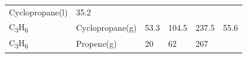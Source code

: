 \documentclass[
]{book}
\theoremstyle{definition}
\theoremstyle{definition}
\theoremstyle{definition}
\theoremstyle{remark}
\begin{document}
\begin{longtable}[]{@{}llllll@{}}
\begin{minipage}[t]{0.17\columnwidth}
Cyclopropane(l)\strut
\end{minipage} & \begin{minipage}[t]{0.15\columnwidth}\raggedright
35.2\strut
\end{minipage} & \begin{minipage}[t]{0.15\columnwidth}\raggedright
\strut
\end{minipage} & \begin{minipage}[t]{0.14\columnwidth}\raggedright
\strut
\end{minipage} & \begin{minipage}[t]{0.14\columnwidth}\raggedright
\strut
\end{minipage}\tabularnewline
\begin{minipage}[t]{0.07\columnwidth}\raggedright
C\textsubscript{3}H\textsubscript{6}\strut
\end{minipage} & \begin{minipage}[t]{0.17\columnwidth}\raggedright
Cyclopropane(g)\strut
\end{minipage} & \begin{minipage}[t]{0.15\columnwidth}\raggedright
53.3\strut
\end{minipage} & \begin{minipage}[t]{0.15\columnwidth}\raggedright
104.5\strut
\end{minipage} & \begin{minipage}[t]{0.14\columnwidth}\raggedright
237.5\strut
\end{minipage} & \begin{minipage}[t]{0.14\columnwidth}\raggedright
55.6\strut
\end{minipage}\tabularnewline
\begin{minipage}[t]{0.07\columnwidth}\raggedright
C\textsubscript{3}H\textsubscript{6}\strut
\end{minipage} & \begin{minipage}[t]{0.17\columnwidth}\raggedright
Propene(g)\strut
\end{minipage} & \begin{minipage}[t]{0.15\columnwidth}\raggedright
20\strut
\end{minipage} & \begin{minipage}[t]{0.15\columnwidth}\raggedright
62\strut
\end{minipage} & \begin{minipage}[t]{0.14\columnwidth}\raggedright
267\strut
\end{minipage} & \begin{minipage}[t]{0.14\columnwidth}\raggedright

\end{minipage}
\end{longtable}
\end{document}
